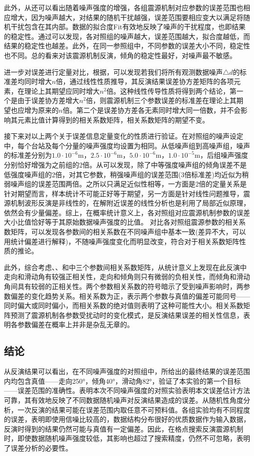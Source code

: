 此外，从还可以看出随着噪声强度的增强，各组震源机制对应参数的误差范围也相应增大，因为噪声越大，对结果的随机干扰越强，误差范围要相应变大以满足将随机干扰包含在其内部。数据的拟合度Fit有效地反映了噪声的干扰程度，也即结果的稳定性。通过可以发现，各对照组的噪声越大，误差范围越大，拟合度越低，而结果的稳定性也越差。此外，在同一参照组中，不同参数的误差大小不同，稳定性也不同。总的看来对该震源机制反演，倾角的稳定性最好，对噪声最不敏感。

进一步对误差进行定量对比，根据，可以发现若我们将所有观测数据噪声${\triangle}d$的标准差均同时增大$n$倍，通过线性性质推导，其反演结果误差协方差矩阵的各项元素，在理论上其期望应同时增大$n^2$倍。这种线性传导性质将得到两个结论，第一个是由于误差协方差增大$n^2$倍，则震源机制三个参数误差的标准差在理论上其期望也应增为原来的$n$倍。第二个是误差协方差各无素同时增大同一倍数，并不会影响其元素比值计算得到的相关系数矩阵，相关系数矩阵的期望不变。

接下来对以上两个关于误差信息定量变化的性质进行验证。在对照组的噪声设定中，每个台站及每个分量的噪声强度均设置为相同。从低噪声组到高噪声组，噪声的标准差分别为$1.0\cdot10^{-6}$m，$2.5\cdot10^{-6}$m，$5.0\cdot10^{-6}$m，$1.0\cdot10^{-5}$m，后组噪声强度分别恰好增强为之前组的2倍。从可以发现，除了中等强度噪声组的倾角误差不是低强度噪声组的2倍，对其它参数，稍强噪声组的误差范围(3倍标准差)均近似为稍弱噪声组的误差范围两倍。之所以只满足近似性相等，一方面是2倍的定量关系是针对期望而言，样本统计不可能正好等于期望，另一方面是针对线性问题推导，震源机制波形反演是非线性的，在解附近误差的线性分析也是利用了局部近似原理，依然会有少量偏差。综上，在概率统计意义上，各对照组对应震源机制参数的误差大小比值恰好等于其原始数据噪声强度的比值。
对比各对照组震源参数的相关系数矩阵，可以发现各参数间的相关系数在不同噪声组中基本一致(差异不大，可以用统计偏差进行解释)，不随噪声强度变化而明显改变，符合对于相关系数矩阵性质的推论。

此外，综合考虑、、和中三个参数间相关系数矩阵，从统计意义上发现在此反演中走向和滑动角有较强正相关性，走向和倾角则只有微弱的负相关性，而倾角和滑动角间具有较弱的正相关性。两个参数相关系数的符号暗示了受到噪声影响时，两参数偏差的变化趋势关系。相关系数为正，表示两个参数与真值的偏差可能同号——同时偏大或同时偏小，而相关系数的绝对值则表明了这种可能性大小。相关系数矩阵预测了震源机制各参数受扰动时的变化模式，是反演结果误差的相关性信息，表明各参数偏差在概率上并非是杂乱无章的。

\subsection{结论}
从反演结果可以看出，在不同噪声强度的对照组中，所给出的最终结果的误差范围内均包含真值——走向250°，倾角40°，滑动角82°，验证了本实验的第一个目标——误差范围的准确性。表明本次不同噪声强度的对照实验表明本文误差估计方法可靠，其有效地反映了不同数据随机噪声对反演结果造成的误差。从随机性角度分析，一次反演的结果可能在误差范围内取任意不可预料值。各组实验均有不同程度的误差，表明即使用信噪比较高的，数据结构分布很好的优质数据作为输入数据，反演时得到的结果仍然可能与真值有一定偏差。因此，在格点搜索反演震源机制时，即使数据随机噪声强度较低，其影响也超过了搜索精度，仍然不可忽略，表明了误差分析的必要性。

